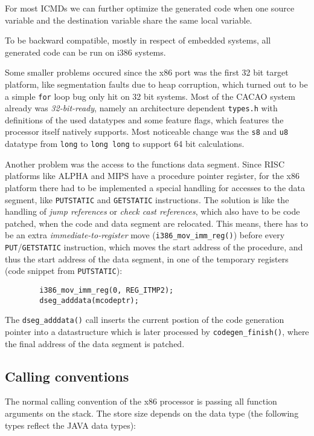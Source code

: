 For most ICMDs we can further optimize the generated code when one
source variable and the destination variable share the same local
variable.

To be backward compatible, mostly in respect of embedded systems, all
generated code can be run on i386 systems.

Some smaller problems occured since the x86 port was the first 32 bit
target platform, like segmentation faults due to heap corruption,
which turned out to be a simple \texttt{for} loop bug only hit on 32
bit systems. Most of the CACAO system already was
\textit{32-bit-ready}, namely an architecture dependent
\texttt{types.h} with definitions of the used datatypes and some
feature flags, which features the processor itself natively
supports. Most noticeable change was the \texttt{s8} and \texttt{u8}
datatype from \texttt{long} to \texttt{long long} to support 64 bit
calculations.

Another problem was the access to the functions data segment. Since
RISC platforms like ALPHA and MIPS have a procedure pointer register,
for the x86 platform there had to be implemented a special handling
for accesses to the data segment, like \texttt{PUTSTATIC} and
\texttt{GETSTATIC} instructions. The solution is like the handling of
\textit{jump references} or \textit{check cast references}, which also
have to be code patched, when the code and data segment are
relocated. This means, there has to be an extra
\textit{immediate-to-register} move (\texttt{i386\_mov\_imm\_reg()})
before every \texttt{PUT}/\texttt{GETSTATIC} instruction, which moves
the start address of the procedure, and thus the start address of the
data segment, in one of the temporary registers (code snippet from
\texttt{PUTSTATIC}):

\begin{verbatim}
        i386_mov_imm_reg(0, REG_ITMP2);
        dseg_adddata(mcodeptr);
\end{verbatim}

The \texttt{dseg\_adddata()} call inserts the current postion of the
code generation pointer into a datastructure which is later processed
by \texttt{codegen\_finish()}, where the final address of the data
segment is patched.


\subsection{Calling conventions}

The normal calling convention of the x86 processor is passing all
function arguments on the stack. The store size depends on the data
type (the following types reflect the JAVA data types):

